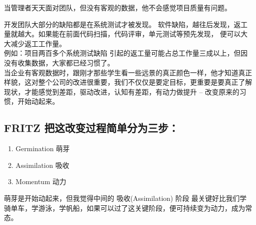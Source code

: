 
当管理者天天面对团队，但没有客观的数据，他不会感觉项目质量有问题。

开发团队大部分的缺陷都是在系统测试才被发现。
软件缺陷，越往后发现，返工量就越大。如果能在前面代码扫描，代码评审，单元测试等预先发现，
便可以大大减少返工工作量。\\
例如：项目两百多个系统测试缺陷
引起的返工量可能占总工作量三成以上，但因没有收集数据，大家都已经习惯了。\\
当企业有客观数据时，跟刚才那些学生看一些远景的真正颜色一样，他才知道真正样貌，这对整个公司的改进很重要，我们不仅仅是要定目标，更重要是要真正了解现状，才能感觉到差距，驱动改进，认知有差距，有动力做提升
-- 改变原来的习惯，开始动起来。

\hypertarget{fritz-ux628aux8fd9ux6539ux53d8ux8fc7ux7a0bux7b80ux5355ux5206ux4e3aux4e09ux6b65}{%
\subsection{FRITZ
把这改变过程简单分为三步：}\label{fritz-ux628aux8fd9ux6539ux53d8ux8fc7ux7a0bux7b80ux5355ux5206ux4e3aux4e09ux6b65}}

\begin{enumerate}
\tightlist
\item
  Germination 萌芽
\item
  Assimilation 吸收
\item
  Momentum 动力
\end{enumerate}

萌芽是开始动起来，但我觉得中间的 吸收(Assimilation) 阶段
最关键好比我们学骑单车，学游泳，学帆船，如果可以过了这关键阶段，便可持续变为动力，成为常态。

